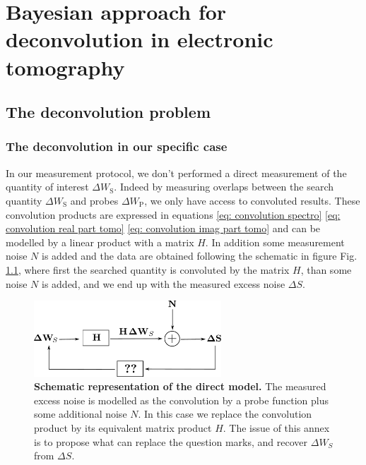 \chapter{Bayesian approach for deconvolution in electronic tomography \label{sec: Bayesian approach for deconvolution in electronic tomography}}


\section{\texorpdfstring{The deconvolution problem}{The deconvolution problem}\label{sec: The deconvolution problem}}





\subsection{\texorpdfstring{The deconvolution in our specific case}{The deconvolution in our specific case}}

In our measurement protocol, we don't performed a direct measurement of the quantity of interest $\Delta W_{\mathrm{S}}$. Indeed by measuring overlaps between the search quantity $\Delta W_{\mathrm{S}}$ and probes $\Delta W_{\mathrm{P}}$, we only have access to convoluted results. These convolution products are expressed in equations \eqref{eq: convolution spectro} \eqref{eq: convolution real part tomo} \eqref{eq: convolution imag part tomo} and can be modelled by a linear product with a matrix $H$. In addition some measurement noise $N$ is added and the data are obtained following the schematic in figure Fig. \ref{fig: direct model}, where first the searched quantity is convoluted by the matrix $H$, than some noise $N$ is added, and we end up with the measured excess noise $\Delta S$.

\begin{figure}[h]
	\centering
	\includegraphics[width = 7cm]{./appA/direct_model}
	\caption{\textbf{Schematic representation of the direct model.} The measured excess noise is modelled as the convolution by a probe function plus some additional noise $N$. In this case we replace the convolution product by its equivalent matrix product $H$. The issue of this annex is to propose what can replace the question marks, and recover $\Delta W_{S}$ from $\Delta S$.}
	\label{fig: direct model}
\end{figure}

